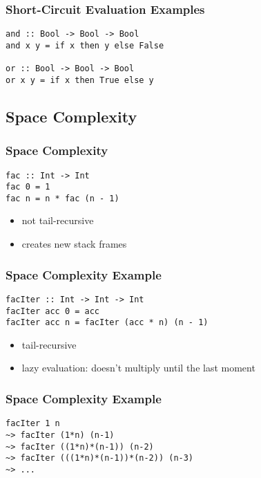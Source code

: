 \documentclass[dvipsnames]{beamer}
\theoremstyle{plain}
\begin{document}
\begin{frame}[fragile]
  \frametitle{Short-Circuit Evaluation Examples}

  \begin{lstlisting}[deletekeywords={and,not,or}]
and :: Bool -> Bool -> Bool
and x y = if x then y else False

or :: Bool -> Bool -> Bool
or x y = if x then True else y
  \end{lstlisting}
\end{frame}

\subsection{Space Complexity}

\begin{frame}[fragile]
  \frametitle{Space Complexity}

  \begin{exampleblock}{}
    \begin{lstlisting}
fac :: Int -> Int
fac 0 = 1
fac n = n * fac (n - 1)
    \end{lstlisting}
  \end{exampleblock}

  \begin{itemize}
    \item not tail-recursive
    \item creates new stack frames
  \end{itemize}
\end{frame}

\begin{frame}[fragile]
  \frametitle{Space Complexity Example}

  \begin{exampleblock}{}
    \begin{lstlisting}
facIter :: Int -> Int -> Int
facIter acc 0 = acc
facIter acc n = facIter (acc * n) (n - 1)
    \end{lstlisting}
  \end{exampleblock}

  \begin{itemize}
    \item tail-recursive
    \item lazy evaluation: doesn't multiply until the last moment
  \end{itemize}
\end{frame}

\begin{frame}[fragile]
  \frametitle{Space Complexity Example}

  \begin{lstlisting}
facIter 1 n
~> facIter (1*n) (n-1)
~> facIter ((1*n)*(n-1)) (n-2)
~> facIter (((1*n)*(n-1))*(n-2)) (n-3)
~> ...
  \end{lstlisting}
\end{frame}
\end{document}
